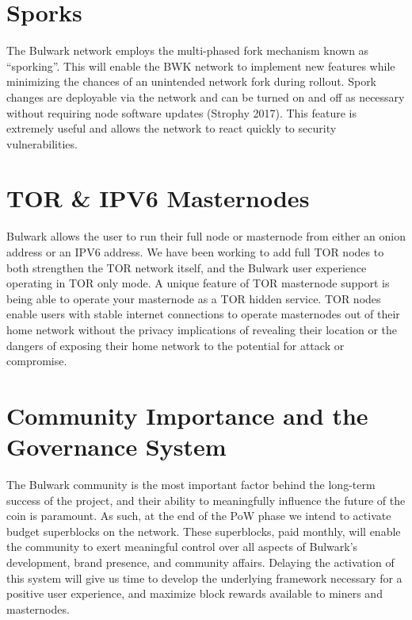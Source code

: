 \documentclass[11pt,a4paperpaper,]{report}
\begin{document}
\section{Sporks}\label{sporks}

The Bulwark network employs the multi-phased fork mechanism known as
``sporking''. This will enable the BWK network to implement new features
while minimizing the chances of an unintended network fork during
rollout. Spork changes are deployable via the network and can be turned
on and off as necessary without requiring node software updates (Strophy
2017). This feature is extremely useful and allows the network to react
quickly to security vulnerabilities.

\section{TOR \& IPV6 Masternodes}\label{tor-ipv6-masternodes}

Bulwark allows the user to run their full node or masternode from either
an onion address or an IPV6 address. We have been working to add full
TOR nodes to both strengthen the TOR network itself, and the Bulwark
user experience operating in TOR only mode. A unique feature of TOR
masternode support is being able to operate your masternode as a TOR
hidden service. TOR nodes enable users with stable internet connections
to operate masternodes out of their home network without the privacy
implications of revealing their location or the dangers of exposing
their home network to the potential for attack or compromise.

\section{Community Importance and the Governance
System}\label{community-importance-and-the-governance-system}

The Bulwark community is the most important factor behind the long-term
success of the project, and their ability to meaningfully influence the
future of the coin is paramount. As such, at the end of the PoW phase we
intend to activate budget superblocks on the network. These superblocks,
paid monthly, will enable the community to exert meaningful control over
all aspects of Bulwark's development, brand presence, and community
affairs. Delaying the activation of this system will give us time to
develop the underlying framework necessary for a positive user
experience, and maximize block rewards available to miners and
masternodes.
\end{document}
